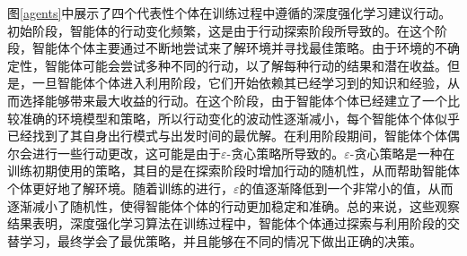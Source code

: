 图\ref{agents}中展示了四个代表性个体在训练过程中遵循的深度强化学习建议行动。初始阶段，智能体的行动变化频繁，这是由于行动探索阶段所导致的。在这个阶段，智能体个体主要通过不断地尝试来了解环境并寻找最佳策略。由于环境的不确定性，智能体可能会尝试多种不同的行动，以了解每种行动的结果和潜在收益。但是，一旦智能体个体进入利用阶段，它们开始依赖其已经学习到的知识和经验，从而选择能够带来最大收益的行动。在这个阶段，由于智能体个体已经建立了一个比较准确的环境模型和策略，所以行动变化的波动性逐渐减小，每个智能体个体似乎已经找到了其自身出行模式与出发时间的最优解。在利用阶段期间，智能体个体偶尔会进行一些行动更改，这可能是由于$\varepsilon$-贪心策略所导致的。$\varepsilon$-贪心策略是一种在训练初期使用的策略，其目的是在探索阶段时增加行动的随机性，从而帮助智能体个体更好地了解环境。随着训练的进行，$\varepsilon$的值逐渐降低到一个非常小的值，从而逐渐减小了随机性，使得智能体个体的行动更加稳定和准确。总的来说，这些观察结果表明，深度强化学习算法在训练过程中，智能体个体通过探索与利用阶段的交替学习，最终学会了最优策略，并且能够在不同的情况下做出正确的决策。


